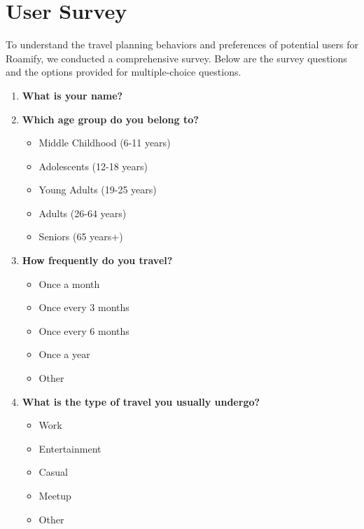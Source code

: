\documentclass[conference]{IEEEtran}
\begin{document}
\newpage

\appendix

\section{User Survey}
    To understand the travel planning behaviors and preferences of potential users for Roamify, we conducted a comprehensive survey. Below are the survey questions and the options provided for multiple-choice questions.

    \begin{enumerate}
        \item \textbf{What is your name?}

        \item \textbf{Which age group do you belong to?}
        \begin{itemize}
            \item Middle Childhood (6-11 years)
            \item Adolescents (12-18 years)
            \item Young Adults (19-25 years)
            \item Adults (26-64 years)
            \item Seniors (65 years+)
        \end{itemize}

        \item \textbf{How frequently do you travel?}
        \begin{itemize}
            \item Once a month
            \item Once every 3 months
            \item Once every 6 months
            \item Once a year
            \item Other
        \end{itemize}

        \item \textbf{What is the type of travel you usually undergo?}
        \begin{itemize}
            \item Work
            \item Entertainment
            \item Casual
            \item Meetup
            \item Other
        \end{itemize}


\end{enumerate}
\end{document}
